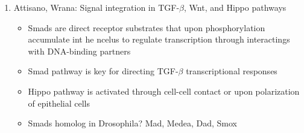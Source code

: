 \documentclass[12pt]{article}
\begin{document}
\begin{enumerate}
\item Attisano, Wrana: Signal integration in TGF-$\beta$, Wnt, and Hippo pathways
\begin{itemize}
	\item Smads are direct receptor substrates that upon phosphorylation accumulate int he ncelus to regulate transcription through interactings with DNA-binding partners
	\item Smad pathway is key for directing TGF-$\beta$ transcriptional responses
	\item Hippo pathway is activated through cell-cell contact or upon polarization of epithelial cells
	\item Smads homolog in Drosophila? Mad, Medea, Dad, Smox 
\end{itemize}
\end{enumerate}
\end{document}
